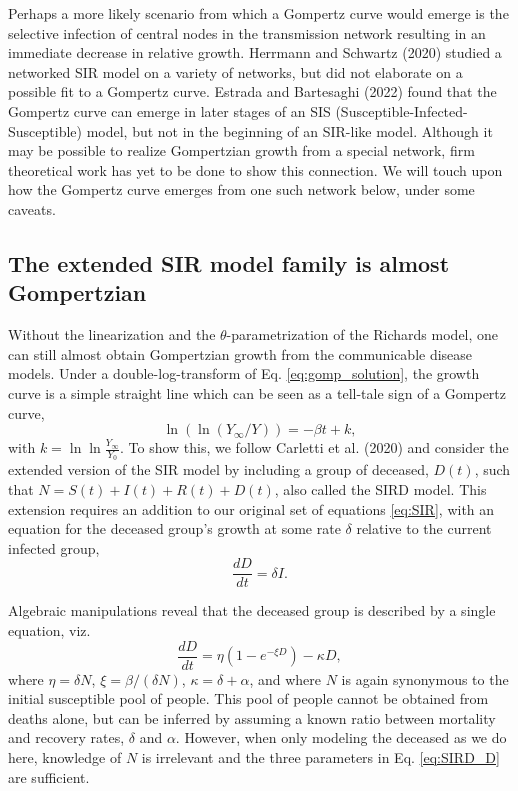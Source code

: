 \documentclass{article}
\begin{document}
 Perhaps a more likely scenario from which a Gompertz curve would emerge is the selective infection of central nodes in the transmission network resulting in an immediate decrease in relative growth. 
 Herrmann and Schwartz (2020) \cite{herrmann2020covid} studied a networked SIR model on a variety of networks, but did not elaborate on a possible fit to a Gompertz curve. Estrada and Bartesaghi (2022) \cite{estrada2022networked} found that the Gompertz curve can emerge in later stages of an SIS (Susceptible-Infected-Susceptible) model, but not in the beginning of an SIR-like model.
 Although it may be possible to realize Gompertzian growth from a special network, firm theoretical work has yet to be done to show this connection. 
 We will touch upon how the Gompertz curve emerges from one such network below, under some caveats.

\subsection*{The extended SIR model family is almost Gompertzian}
Without the linearization and the $\theta$-parametrization of the Richards model, one can still almost obtain Gompertzian growth from the communicable disease models. Under a double-log-transform of Eq. \ref{eq:gomp_solution}, the growth curve is a simple straight line which can be seen as a tell-tale sign of a Gompertz curve,
\begin{equation}
\label{eq:GOMP_D}
\ln{(\ln{(Y_{\infty}/Y)})} = -\beta t + k,
\end{equation}
with $k=\ln{\ln{\frac{Y_{\infty}}{Y_{0}}}}$. To show this, we follow Carletti et al. (2020) \cite{carletti2020covid} and consider the extended version of the SIR model by including a group of deceased, $D(t)$, such that $N = S(t) + I(t) + R(t) + D(t)$, also called the SIRD model. This extension requires an addition to our original set of equations \ref{eq:SIR}, with an equation for the deceased group's growth at some rate $\delta$ relative to the current infected group,
\begin{equation}
\frac{dD}{dt} = \delta I.
\end{equation}

Algebraic manipulations reveal that the deceased group is described by a single equation, viz.
\begin{equation}
\label{eq:SIRD_D}
\frac{dD}{dt} = \eta( 1 - e^{-\xi D}) - \kappa D,
\end{equation}
where $\eta = \delta N$, $\xi = \beta/(\delta N)$, $\kappa = \delta + \alpha$, and where $N$ is again synonymous to the initial susceptible pool of people. This pool of people cannot be obtained from deaths alone, but can be inferred by assuming a known ratio between mortality and recovery rates, $\delta$ and $\alpha$. 
However, when only modeling the deceased as we do here, knowledge of $N$ is irrelevant and the three parameters in Eq. \ref{eq:SIRD_D} are sufficient.
\end{document}

